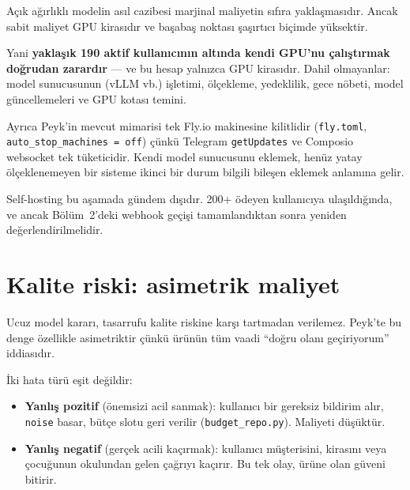 \documentclass[11pt,a4paper]{article}
\newcommand{\code}[1]{\texttt{\small #1}}
\newenvironment{keybox}
  {\begin{center}\begin{lrbox}{\kbox}\begin{minipage}{0.90\textwidth}\color{ink}\small}
  {\end{minipage}\end{lrbox}\setlength{\fboxsep}{11pt}\colorbox{soft}{\usebox{\kbox}}\end{center}}
\begin{document}
Açık ağırlıklı modelin asıl cazibesi marjinal maliyetin sıfıra yaklaşmasıdır. Ancak sabit
maliyet GPU kirasıdır ve başabaş noktası şaşırtıcı biçimde yüksektir.

\begin{table}[h]
\centering\small

\caption{Başabaş, Haiku 4.5 ile triage maliyetine göre. On-demand fiyatlar varsayımdır.}
\end{table}

Yani \textbf{yaklaşık 190 aktif kullanıcının altında kendi GPU'nu çalıştırmak
doğrudan zarardır} --- ve bu hesap yalnızca GPU kirasıdır. Dahil olmayanlar: model
sunucusunun (vLLM vb.) işletimi, ölçekleme, yedeklilik, gece nöbeti, model güncellemeleri
ve GPU kotası temini.

Ayrıca Peyk'in mevcut mimarisi tek Fly.io makinesine kilitlidir (\code{fly.toml},
\code{auto\_stop\_machines = off}) çünkü Telegram \code{getUpdates} ve Composio websocket
tek tüketicidir. Kendi model sunucusunu eklemek, henüz yatay ölçeklenemeyen bir sisteme
ikinci bir durum bilgili bileşen eklemek anlamına gelir.

\begin{keybox}
Self-hosting bu aşamada gündem dışıdır. 200+ ödeyen kullanıcıya ulaşıldığında, ve ancak
Bölüm~2'deki webhook geçişi tamamlandıktan sonra yeniden değerlendirilmelidir.
\end{keybox}

\section{Kalite riski: asimetrik maliyet}

Ucuz model kararı, tasarrufu kalite riskine karşı tartmadan verilemez. Peyk'te bu denge
özellikle asimetriktir çünkü ürünün tüm vaadi ``doğru olanı geçiriyorum'' iddiasıdır.

İki hata türü eşit değildir:

\begin{itemize}[leftmargin=1.4em,itemsep=3pt]
  \item \textbf{Yanlış pozitif} (önemsizi acil sanmak): kullanıcı bir gereksiz bildirim alır,
        \code{noise} basar, bütçe slotu geri verilir (\code{budget\_repo.py}). Maliyeti düşüktür.
  \item \textbf{Yanlış negatif} (gerçek acili kaçırmak): kullanıcı müşterisini, kirasını
        veya çocuğunun okulundan gelen çağrıyı kaçırır. Bu tek olay, ürüne olan güveni
        bitirir.
\end{itemize}
\end{document}

